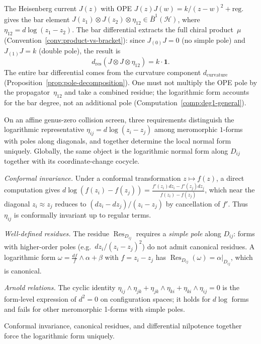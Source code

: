 \begin{example}\label{ex:ope-to-residue}
The Heisenberg current $J(z)$ with OPE $J(z)J(w) = k/(z-w)^2 + \text{reg.}$ gives the bar element $J(z_1) \otimes J(z_2) \otimes \eta_{12} \in \bar{B}^1(\mathcal{H})$, where $\eta_{12} = d\log(z_1 - z_2)$. The bar differential extracts the full chiral product~$\mu$ (Convention~\ref{conv:product-vs-bracket}): since $J_{(0)}J = 0$ (no simple pole) and $J_{(1)}J = k$ (double pole), the result is
\[
d_{\mathrm{res}}(J \otimes J \otimes \eta_{12}) = k \cdot \mathbf{1}.
\]
The entire bar differential comes from the curvature component $d_{\mathrm{curvature}}$ (Proposition~\ref{prop:pole-decomposition}). One must not multiply the OPE pole by the propagator~$\eta_{12}$ and take a combined residue; the logarithmic form accounts for the bar degree, not an additional pole (Computation~\ref{comp:deg1-general}).
\end{example}

\begin{remark}\label{rem:why-log-forced}
On an affine genus-zero collision screen, three requirements
distinguish the logarithmic representative
\(\eta_{ij}=d\log(z_i-z_j)\) among meromorphic \(1\)-forms with poles
along diagonals, and together determine the local normal form
uniquely. Globally, the same object is the logarithmic normal form
along \(D_{ij}\) together with its coordinate-change cocycle.

\emph{Conformal invariance.}
Under a conformal transformation $z \mapsto f(z)$, a direct computation gives
$d\log(f(z_i) - f(z_j)) = \frac{f'(z_i)dz_i - f'(z_j)dz_j}{f(z_i) - f(z_j)}$,
which near the diagonal $z_i \approx z_j$ reduces to $(dz_i - dz_j)/(z_i - z_j)$
by cancellation of $f'$. Thus $\eta_{ij}$ is conformally invariant up to regular terms.

\emph{Well-defined residues.}
The residue $\operatorname{Res}_{D_{ij}}$ requires a \emph{simple pole} along $D_{ij}$: forms with higher-order poles (e.g.\ $dz_i/(z_i - z_j)^2$) do not admit canonical residues. A logarithmic form $\omega = \frac{df}{f} \wedge \alpha + \beta$ with $f = z_i - z_j$ has $\operatorname{Res}_{D_{ij}}(\omega) = \alpha|_{D_{ij}}$, which is canonical.

\emph{Arnold relations.}
The cyclic identity
$\eta_{ij} \wedge \eta_{jk} + \eta_{jk} \wedge \eta_{ki} + \eta_{ki} \wedge \eta_{ij} = 0$
is the form-level expression of $d^2 = 0$ on configuration spaces; it holds for $d\log$ forms and fails for other meromorphic 1-forms with simple poles.

Conformal invariance, canonical residues, and differential nilpotence together force the logarithmic form uniquely.
\end{remark}

